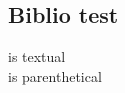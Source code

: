 \subsection*{Biblio test}
\citet{carozzani_direct_2013} is textual \\
\citep{carozzani_direct_2013} is parenthetical \\
